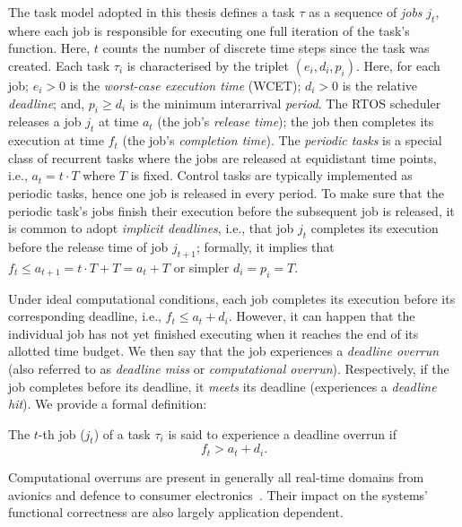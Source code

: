 The task model adopted in this thesis defines a task $\tau$ as a sequence of \emph{jobs} $j_t$, where each job is responsible for executing one full iteration of the task's function.
Here, $t$ counts the number of discrete time steps since the task was created.
Each task $\tau_i$ is characterised by the triplet $(e_i, d_i, p_i)$.
Here, for each job; $e_i > 0$ is the \emph{worst-case execution time} (WCET); $d_i > 0$ is the relative \emph{deadline}; and, $p_i \geq d_i$ is the minimum interarrival \emph{period}.
The RTOS scheduler releases a job $j_t$ at time $a_t$ (the job's \emph{release time}); the job then completes its execution at time $f_t$ (the job's \emph{completion time}).
The \emph{periodic tasks} is a special class of recurrent tasks where the jobs are released at equidistant time points, i.e., $a_t = t\cdot T$ where $T$ is fixed. 
Control tasks are typically implemented as periodic tasks, hence one job is released in every period.
To make sure that the periodic task's jobs finish their execution before the subsequent job is released, it is common to adopt \emph{implicit deadlines}, i.e., that job $j_t$ completes its execution before the release time of job $j_{t+1}$; formally, it implies that $f_t \leq a_{t+1} = t\cdot T+T = a_t + T$ or simpler $d_i = p_i = T$.

Under ideal computational conditions, each job completes its execution before its corresponding deadline, i.e., $f_t \leq a_t + d_i$.
However, it can happen that the individual job has not yet finished executing when it reaches the end of its allotted time budget.
We then say that the job experiences a \emph{deadline overrun} (also referred to as \emph{deadline miss} or \emph{computational overrun}).
Respectively, if the job completes before its deadline, it \emph{meets} its deadline (experiences a \emph{deadline hit}).
We provide a formal definition:
%
\begin{definition}%
    \label{def:overrun}%
    The $t$-th job ($j_t$) of a task $\tau_i$ is said to experience a deadline overrun if
    \begin{equation}
        f_t > a_t + d_i.
    \end{equation}
\end{definition}
%
Computational overruns are present in generally all real-time domains from avionics and defence to consumer electronics~\cite{Akesson:2020}.
Their impact on the systems' functional correctness are also largely application dependent.


